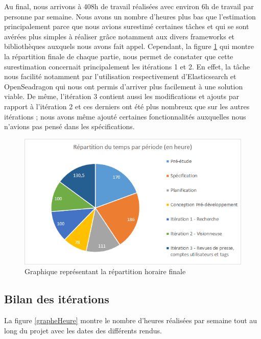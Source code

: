 Au final, nous arrivons à 408h de travail réalisées avec environ 6h de travail par personne par semaine. Nous avons un nombre d'heures plus bas que l'estimation principalement parce que nous avions surestimé certaines tâches et qui se sont avérées plus simples à réaliser grâce notamment aux divers frameworks et bibliothèques auxquels nous avons fait appel. Cependant, la figure \ref{Camsec} qui montre la répartition finale de chaque partie, nous permet de constater que cette surestimation concernait principalement les itérations 1 et 2. En effet, la tâche nous facilité notamment par l'utilisation respectivement d'Elasticsearch et OpenSeadragon qui nous ont permis d'arriver plus facilement à une solution viable. De même, l'itération 3 contient aussi les modifications et ajouts par rapport à l'itération 2 et ces derniers ont été plus nombreux que sur les autres itérations ; nous avons même ajouté certaines fonctionnalités auxquelles nous n'avions pas pensé dans les spécifications. 

	\begin{figure}[H]
        \centering
        \includegraphics[width=\textwidth]{figure/camembertsecond.png}
            \caption{Graphique représentant la répartition horaire finale}
            \label{Camsec}
    \end{figure}

\subsection{Bilan des itérations}

La figure \ref{grapheHeure} montre le nombre d'heures réalisées par semaine tout au long du projet avec les dates des différents rendus. 

